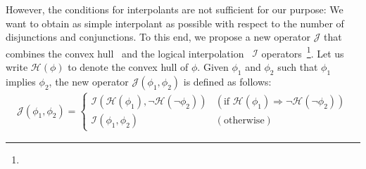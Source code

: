 However, the conditions for interpolants are not sufficient for our 
purpose: We want to obtain as simple interpolant as possible with 
respect to the number of disjunctions and conjunctions.  To this end, we 
propose a new operator \(\mathcal{J}\) that combines the convex 
hull~\cite{} and the logical interpolation~\cite{} \(\mathcal{I}\) 
operators~\footnote{}.  Let us 
write \(\mathcal{H}(\phi)\) to denote the convex hull of \(\phi\).  
Given \(\phi_1\) and \(\phi_2\) such that \(\phi_1\) implies \(\phi_2\), 
the new operator \(\mathcal{J}(\phi_1,\phi_2)\) is defined as follows:
\begin{eqnarray*}
\mathcal{J}(\phi_1,\phi_2) =
\left\{
\begin{array}{ll}
\mathcal{I}(\mathcal{H}(\phi_1),\neg \mathcal{H}(\neg \phi_2)) & (\mbox{if~}\mathcal{H}(\phi_1) \Rightarrow \neg \mathcal{H}(\neg \phi_2)) \\
\mathcal{I}(\phi_1,\phi_2) & (\mbox{otherwise})
\end{array}
\right.
\end{eqnarray*}

%
